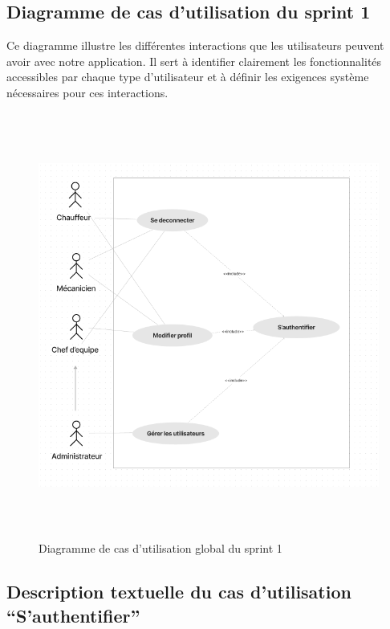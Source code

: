 
\subsection{Diagramme de cas d’utilisation du sprint 1}

Ce diagramme illustre les différentes interactions que les utilisateurs peuvent avoir avec notre application. Il sert à identifier clairement les fonctionnalités accessibles par chaque type d'utilisateur et à définir les exigences système nécessaires pour ces interactions.

\begin{figure}[ht!]
  \centering
  \includegraphics[width=1\textwidth,height=14cm]{chap3.images/usecase global sprint 1.png}
  \caption{Diagramme de cas d’utilisation global du sprint 1}

\end{figure}




\newpage
\subsection{Description textuelle du cas d’utilisation “S’authentifier”}

